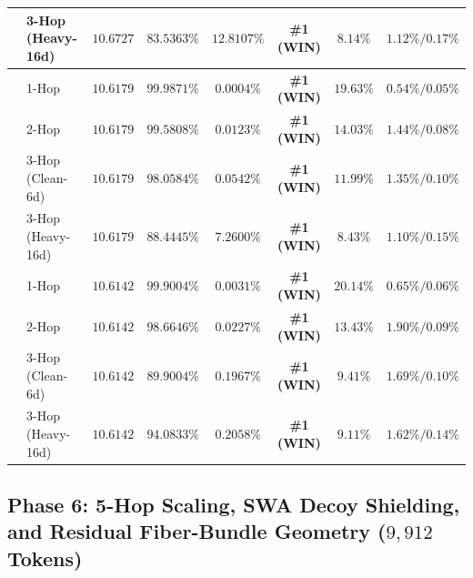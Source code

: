 \documentclass[11pt,letterpaper]{article}
\theoremstyle{definition}
\begin{document}
\begin{table}[!htbp]
{\begin{tabular}{@{}llcccccc@{}}
 & 3-Hop (Heavy-16d) & $10.6727$ & $\mathbf{83.5363\%}$ & $12.8107\%$ & \textbf{\#1 (WIN)} & $8.14\%$  & $1.12\% / 0.17\%$\\
\midrule
{}
 & 1-Hop             & $10.6179$ & $99.9871\%$ & $0.0004\%$ & \textbf{\#1 (WIN)} & $19.63\%$ & $0.54\% / 0.05\%$ \\
 & 2-Hop             & $10.6179$ & $\mathbf{99.5808\%}$ & $0.0123\%$ & \textbf{\#1 (WIN)} & $14.03\%$ & $1.44\% / 0.08\%$ \\
 & 3-Hop (Clean-6d)  & $10.6179$ & $\mathbf{98.0584\%}$ & $\mathbf{0.0542\%}$ & \textbf{\#1 (WIN)} & $11.99\%$ & $1.35\% / 0.10\%$ \\
 & 3-Hop (Heavy-16d) & $10.6179$ & $\mathbf{88.4445\%}$ & $7.2600\%$ & \textbf{\#1 (WIN)} & $8.43\%$  & $1.10\% / 0.15\%$\\
\midrule
{}
 & 1-Hop             & $\mathbf{10.6142}$ & $99.9004\%$ & $0.0031\%$ & \textbf{\#1 (WIN)} & $20.14\%$ & $0.65\% / 0.06\%$ \\
 & 2-Hop             & $\mathbf{10.6142}$ & $98.6646\%$ & $0.0227\%$ & \textbf{\#1 (WIN)} & $13.43\%$ & $1.90\% / 0.09\%$ \\
 & 3-Hop (Clean-6d)  & $\mathbf{10.6142}$ & $89.9004\%$ & $0.1967\%$ & \textbf{\#1 (WIN)} & $9.41\%$  & $1.69\% / 0.10\%$ \\
 & 3-Hop (Heavy-16d) & $\mathbf{10.6142}$ & $\mathbf{94.0833\%}$ & $\mathbf{0.2058\%}$ & \textbf{\#1 (WIN)} & $9.11\%$  & $1.62\% / 0.14\%$ \\
\bottomrule
\end{tabular}%
}
\end{table}

\subsection{Phase 6: 5-Hop Scaling, SWA Decoy Shielding, and Residual Fiber-Bundle Geometry (\texorpdfstring{$9,912$}{9,912} Tokens)}
\end{document}
